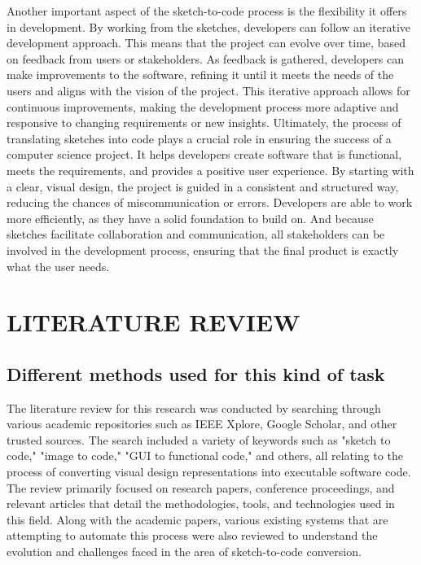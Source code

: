     Another important aspect of the sketch-to-code process is the flexibility it offers in development. By working from the sketches, developers can follow an iterative development approach. This means that the project can evolve over time, based on feedback from users or stakeholders. As feedback is gathered, developers can make improvements to the software, refining it until it meets the needs of the users and aligns with the vision of the project. This iterative approach allows for continuous improvements, making the development process more adaptive and responsive to changing requirements or new insights.
    Ultimately, the process of translating sketches into code plays a crucial role in ensuring the success of a computer science project. It helps developers create software that is functional, meets the requirements, and provides a positive user experience. By starting with a clear, visual design, the project is guided in a consistent and structured way, reducing the chances of miscommunication or errors. Developers are able to work more efficiently, as they have a solid foundation to build on. And because sketches facilitate collaboration and communication, all stakeholders can be involved in the development process, ensuring that the final product is exactly what the user needs.
    
    
    \pagebreak
\section{\MakeUppercase{Literature Review}}    
\subsection{Different methods used for this kind of task}
    \sloppy  
The literature review for this research was conducted by searching 
through various academic repositories such as IEEE Xplore, Google 
Scholar, and other trusted sources. The search included a variety 
of keywords such as "sketch to code," "image to code," "GUI to 
functional code," and others, all relating to the process of 
converting visual design representations into executable software
 code. The review primarily focused on research papers, conference
  proceedings, and relevant articles that detail the methodologies,
   tools, and technologies used in this field. Along with the academic
    papers, various existing systems that are attempting to automate 
    this process were also reviewed to understand the evolution and
     challenges faced in the area of sketch-to-code conversion.


